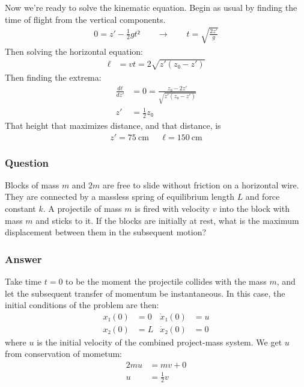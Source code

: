 Now we're ready to solve the kinematic equation. Begin as usual by finding the
time of flight from the vertical components.
\begin{align*}
    0 = z' - \frac 12 gt²
	\quad\quad\rightarrow\quad\quad
    t = \sqrt{\frac{2z'}{g}}
\end{align*}
Then solving the horizontal equation:
\begin{align*}
    ℓ &= vt = 2\sqrt{z'(z₀ - z')}
\end{align*}
Then finding the extrema:
\begin{align*}
    \frac{dℓ}{dz'} &= 0 = \frac{z₀ - 2z'}{\sqrt{z'(z₀-z')}} \\
    z' &= \frac 12 z₀
\end{align*}
That height that maximizes distance, and that distance, is
\begin{align}
    \boxed{
    z' = \SI{75}{\cm}
    }
    &&
    \boxed{
    ℓ  = \SI{150}{\cm}
    }
\end{align}

\subsubsection{Question}

Blocks of mass $m$ and $2m$ are free to slide without friction on a
horizontal wire. They are connected by a massless spring of equilibrium
length $L$ and force constant $k$. A projectile of mass $m$ is fired with
velocity $v$ into the block with mass $m$ and sticks to it. If the blocks
are initially at rest, what is the maximum displacement between them in the
subsequent motion?

\subsubsection{Answer}

Take time $t=0$ to be the moment the projectile collides with the mass $m$,
and let the subsequent transfer of momentum be instantaneous. In this case,
the initial conditions of the problem are then:
\begin{align*}
    x₁(0) &= 0			& \dot x₁(0) &= u \\
    x₂(0) &= L			& \dot x₂(0) &= 0
\end{align*}
where $u$ is the initial velocity of the combined project-mass system. We get
$u$ from conservation of mometum:
\begin{align*}
    2mu &= mv + 0 \\
    u &= \frac 12 v
\end{align*}

